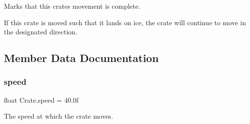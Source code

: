 Marks that this crate\textquotesingle{}s movement is complete. 

If this crate is moved such that it lands on ice, the crate will continue to move in the designated direction. 

\subsection{Member Data Documentation}
\mbox{\label{class_crate_aa8fcf51e527307c91d32173155b53ffb}} 
\subsubsection{\texorpdfstring{speed}{speed}}
{\footnotesize\ttfamily float Crate.\+speed = 40.\+0f}



The speed at which the crate moves. 

